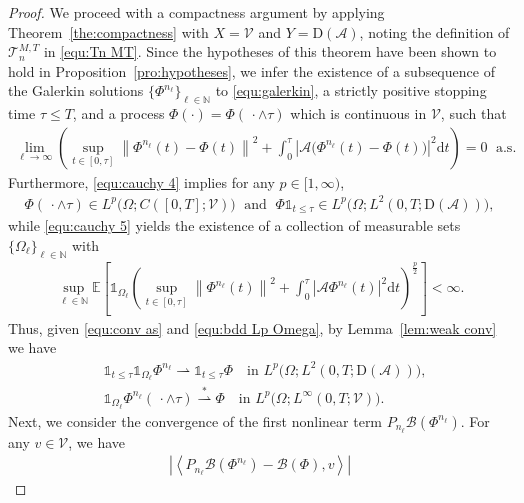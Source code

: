 \documentclass[11pt, reqno]{amsart}
\theoremstyle{definition}
\numberwithin{equation}{section}
\newcommand{\bb}{\mathbb}
\newcommand{\dt}{\mathrm{d}t}
\newcommand{\norm}[1]{\left\|{#1}\right\|}
\newcommand{\inpro}[2]{\left\langle#1,#2\right\rangle}
\newcommand{\abs}[1]{\left|{#1}\right|}
\newcommand{\one}{\mathds{1}}
\begin{document}
\begin{proof}
We proceed with a compactness argument by applying Theorem~\ref{the:compactness} with $X=\mathcal{V}$ and $Y=\mathrm{D}(\mathcal{A})$, noting the definition of $\mathcal{T}_n^{M,T}$ in \eqref{equ:Tn MT}. Since the hypotheses of this theorem have been shown to hold in Proposition~\ref{pro:hypotheses}, we infer the existence of a subsequence of the Galerkin solutions $\{\Phi^{n_\ell}\}_{\ell\in \bb{N}}$ to \eqref{equ:galerkin}, a strictly positive stopping time $\tau\leq T$, and a process $\Phi(\cdot)= \Phi(\,\cdot\wedge\tau)$ which is continuous in $\mathcal{V}$, such that
\begin{align}\label{equ:conv as}
	\lim_{\ell\to\infty} \left(\sup_{t\in [0,\tau]} \norm{\Phi^{n_\ell}(t)-\Phi(t)}^2 + \int_0^\tau \abs{\mathcal{A} \big(\Phi^{n_\ell}(t) -\Phi(t)\big)}^2 \dt \right) = 0\; \text{ a.s.}
\end{align}
Furthermore, \eqref{equ:cauchy 4} implies for any $p\in [1,\infty)$,
\begin{align}\label{equ:reg Phi}
	\Phi(\,\cdot\wedge\tau) \in L^p\big(\Omega; C([0,T]; \mathcal{V})\big)\;
	\text{ and }\;
	\Phi \one_{t\leq \tau} \in L^p \big(\Omega; L^2(0,T;\mathrm{D}(\mathcal{A}))\big),
\end{align}
while \eqref{equ:cauchy 5} yields the existence of a collection of measurable sets $\{\Omega_\ell\}_{\ell\in \bb{N}}$ with 
\begin{align}\label{equ:bdd Lp Omega}
	\sup_{\ell\in \bb{N}} \bb{E} \left[ \one_{\Omega_\ell} \left( \sup_{t\in [0,\tau]} \norm{\Phi^{n_\ell}(t)}^2 + \int_0^\tau \abs{\mathcal{A}\Phi^{n_\ell}(t)}^2 \dt \right)^{\frac{p}{2}} \right] < \infty.
\end{align}
Thus, given \eqref{equ:conv as} and \eqref{equ:bdd Lp Omega}, by Lemma~\ref{lem:weak conv} we have
\begin{align}
	\label{equ:one Phi conv}
	&\one_{t\leq \tau} \one_{\Omega_\ell} \Phi^{n_\ell} \rightharpoonup \one_{t\leq \tau} \Phi \quad \text{in } L^p\big(\Omega; L^2(0,T;\mathrm{D}(\mathcal{A}))\big),
	\\
	\label{equ:one wedge tau conv}
	&\one_{\Omega_\ell} \Phi^{n_\ell}(\,\cdot\wedge\tau) \overset{\ast}{\rightharpoonup} \Phi \quad \text{in } L^p\big(\Omega;L^\infty(0,T;\mathcal{V})\big).
\end{align}
Next, we consider the convergence of the first nonlinear term $P_{n_\ell}\mathcal{B}(\Phi^{n_\ell})$. For any $v\in \mathcal{V}$, we have
\begin{align*}
	\abs{\inpro{P_{n_\ell} \mathcal{B}(\Phi^{n_\ell})- \mathcal{B}(\Phi)}{v}}

\end{align*}
\end{proof}
\end{document}
